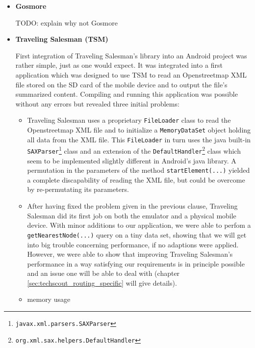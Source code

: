 \begin{itemize}

	\item \textbf{Gosmore}	
	
		TODO: explain why not Gosmore
	
	\item \textbf{Traveling Salesman (TSM)}
	
		First integration of Traveling Salesman's library into an Android project was rather simple, just as one would expect. It was integrated into a first application which was designed to use TSM to read an Openstreetmap XML file stored on the SD card of the mobile device and to output the file's summarized content. Compiling and running this application was possible without any errors but revealed three initial problems:
		
		\begin{itemize}
		
			\item Traveling Salesman uses a proprietary \texttt{FileLoader} class to read the Openstreetmap XML file and to initialize a  \texttt{MemoryDataSet} object holding all data from the XML file. This \texttt{FileLoader} in turn uses the java built-in  \texttt{SAXParser}\footnote{ \texttt{javax.xml.parsers.SAXParser}} class and an extension of the  \texttt{DefaultHandler}\footnote{\texttt{org.xml.sax.helpers.DefaultHandler}} class which seem to be implemented slightly different in Android's java library. A permutation in the parameters of the method  \texttt{startElement(...)} yielded a complete discapability of reading the XML file, but could be overcome by re-permutating its parameters.
			
			\item After having fixed the problem given in the previous clause, Traveling Salesman did its first job on both the emulator and a physical mobile device. With minor additions to our application, we were able to perfom a \texttt{getNearestNode(...)} query on a tiny data set, showing that we will get into big trouble concerning performance, if no adaptions were applied. However, we were able to show that improving Traveling Salesman's performance in a way satisfying our requirements is in principle possible and an issue one will be able to deal with (chapter \ref{sec:techscout_routing_specific} will give details).	

			\item memory usage	
		
		\end{itemize}


\end{itemize}
